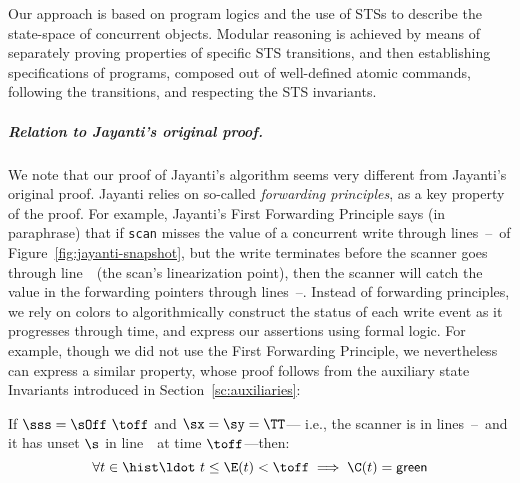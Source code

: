 Our approach is based on program logics and the use of STSs to describe the
state-space of concurrent objects. Modular reasoning is achieved by
means of separately proving properties of specific STS transitions,
and then establishing specifications of programs, composed out of
well-defined atomic commands, following the transitions, and respecting
the STS invariants.

\subparagraph*{Relation to Jayanti's original proof.}
\label{sec:relat-jayant-orig}

We note that our proof of Jayanti's algorithm seems very different
from Jayanti's original proof. Jayanti relies on so-called
\emph{forwarding principles}, as a key property of the proof. For
example, Jayanti's First Forwarding Principle says (in paraphrase)
that if {\tt scan} misses the value of a concurrent write through
lines~\lineScanReadsX--\lineScanReadsY\ of
Figure~\ref{fig:jayanti-snapshot}, but the write terminates before the
scanner goes through line~\lineScanUnsetsS\ (the scan's linearization
point), then the scanner will catch the value in the forwarding
pointers through lines~\lineScanReadsFX--\lineScanReadsFY.
%
Instead of forwarding principles, we rely on colors to algorithmically
construct the status of each write event as it progresses through
time, and express our assertions using formal logic. For example,
though we did not use the First Forwarding Principle, we nevertheless
can express a similar property, whose proof follows from the auxiliary
state Invariants introduced in Section~\ref{sc:auxiliaries}:
%
\begin{myprop}\label{inv:fwd1}%
If $\sss = \sOff\ \toff$ and $\sx = \sy = \TT$--- i.e., the scanner is
in lines~\lineScanReadsFX--\lineScanReadsFY\ and it has unset $\s$ in
line~\lineScanUnsetsS\ at time $\toff$---then:
%
\[\forall t \in
  \hist\ldot\ t \leq \E(t)< \toff \implies \C(t)= \mathsf{green}\]
\end{myprop}
%
%
%


